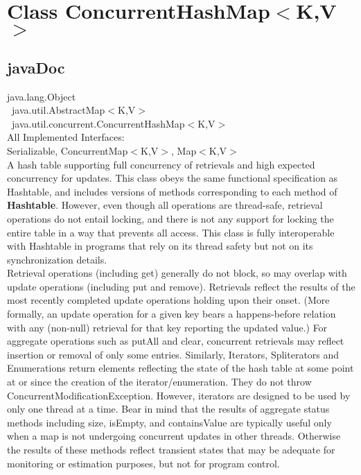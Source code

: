 \documentclass[UTF8,11pt]{ctexbook}
\newcommand{\bold}[1]{\textbf{#1}}
\begin{document}
	\chapter{Class ConcurrentHashMap$<$K,V$>$}
	\section{javaDoc}
    java.lang.Object\\   
    \ java.util.AbstractMap$<$K,V$>$\\  
    \  java.util.concurrent.ConcurrentHashMap$<$K,V$>$ \\  
	
	All Implemented Interfaces:\\
	Serializable, ConcurrentMap$<$K,V$>$, Map$<$K,V$>$\\
	
	A hash table supporting full concurrency of retrievals and high expected concurrency for updates. This class obeys the same functional specification as Hashtable, and includes versions of methods corresponding to each method of \bold{Hashtable}. However, even though all operations are thread-safe, retrieval operations do not entail locking, and there is not any support for locking the entire table in a way that prevents all access. This class is fully interoperable with Hashtable in programs that rely on its thread safety but not on its synchronization details.
	\\
	
	Retrieval operations (including get) generally do not block, so may overlap with update operations (including put and remove). Retrievals reflect the results of the most recently completed update operations holding upon their onset. (More formally, an update operation for a given key bears a happens-before relation with any (non-null) retrieval for that key reporting the updated value.) For aggregate operations such as putAll and clear, concurrent retrievals may reflect insertion or removal of only some entries. Similarly, Iterators, Spliterators and Enumerations return elements reflecting the state of the hash table at some point at or since the creation of the iterator/enumeration. They do not throw ConcurrentModificationException. However, iterators are designed to be used by only one thread at a time. Bear in mind that the results of aggregate status methods including size, isEmpty, and containsValue are typically useful only when a map is not undergoing concurrent updates in other threads. Otherwise the results of these methods reflect transient states that may be adequate for monitoring or estimation purposes, but not for program control.
	\\
	
\end{document}
